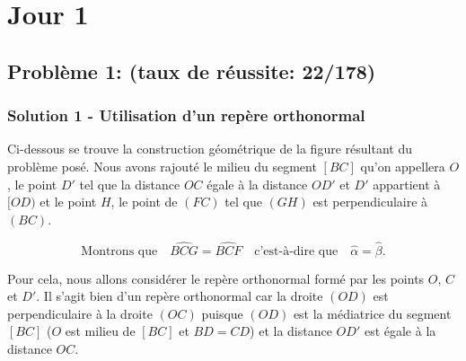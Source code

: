 \documentclass[12pt,a4paper,article]{memoir}
\begin{document}
\section{Jour 1}
\subsection{Problème 1: (taux de réussite: 22/178)}
\subsubsection{Solution 1 - Utilisation d'un repère orthonormal}

Ci-dessous se trouve la construction géométrique de la figure résultant du problème posé. Nous avons rajouté le milieu du segment $[BC]$ qu'on appellera $O$, le point $D'$ tel que la distance $OC$ égale à la distance $OD'$ et $D'$ appartient à $[OD)$ et le point $H$, le point de $(FC)$ tel que $(GH)$ est perpendiculaire à $(BC)$.
 
 \begin{equation}
 \textrm{Montrons que} \quad \widehat{BCG} = \widehat{BCF} \quad \textrm{c'est-à-dire que} \quad \hat{\alpha} = \hat{\beta}.
 \label{question-pb-1-sol-1}
 \end{equation}

Pour cela, nous allons considérer le repère orthonormal formé par les points $O$, $C$ et $D'$. Il s'agit bien d'un repère orthonormal car la droite $(OD)$ est perpendiculaire à la droite $(OC)$ puisque $(OD)$ est la médiatrice du segment $[BC]$ ($O$ est milieu de $[BC]$ et $BD = CD$) et la distance $OD'$ est égale à la distance $OC$.
\end{document}
